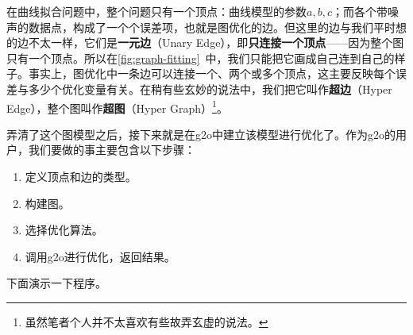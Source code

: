 在曲线拟合问题中，整个问题只有一个顶点：曲线模型的参数$a,b,c$；而各个带噪声的数据点，构成了一个个误差项，也就是图优化的边。但这里的边与我们平时想的边不太一样，它们是\textbf{一元边}（Unary Edge），即\textbf{只连接一个顶点}——因为整个图只有一个顶点。所以在\autoref{fig:graph-fitting}~中，我们只能把它画成自己连到自己的样子。事实上，图优化中一条边可以连接一个、两个或多个顶点，这主要反映每个误差与多少个优化变量有关。在稍有些玄妙的说法中，我们把它叫作\textbf{超边}（Hyper Edge），整个图叫作\textbf{超图}（Hyper Graph）\footnote{虽然笔者个人并不太喜欢有些故弄玄虚的说法。}。

弄清了这个图模型之后，接下来就是在g2o中建立该模型进行优化了。作为g2o的用户，我们要做的事主要包含以下步骤：

\begin{enumerate}
	\item 定义顶点和边的类型。
	\item 构建图。
	\item 选择优化算法。
	\item 调用g2o进行优化，返回结果。
\end{enumerate}

下面演示一下程序。

